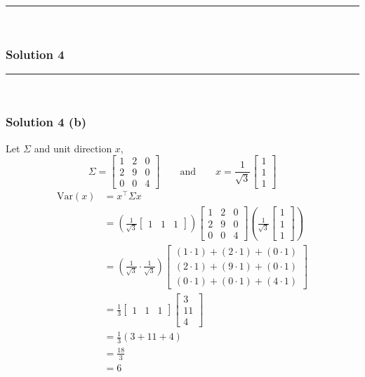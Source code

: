 \documentclass{article}
\begin{document}
\noindent\rule{\textwidth}{0.4pt}\\

\newpage

\subsubsection*{Solution 4}
\noindent\rule{\textwidth}{0.4pt}\\
\subsubsection*{Solution 4 (b)}
Let $\Sigma$ and unit direction $x$,
\[
\Sigma = \begin{bmatrix}
1 & 2 & 0 \\
2 & 9 & 0 \\
0 & 0 & 4
\end{bmatrix}
\qquad\text{and}\qquad
x = \frac{1}{\sqrt{3}}\begin{bmatrix}1 \\ 1 \\ 1\end{bmatrix}
\]
\begin{align*}
\mathrm{Var}(x)
&= x^\top \Sigma x \\
&= \left(\frac{1}{\sqrt{3}}\begin{bmatrix}1 & 1 & 1\end{bmatrix}\right)
\begin{bmatrix}
1 & 2 & 0 \\
2 & 9 & 0 \\
0 & 0 & 4
\end{bmatrix}
\left(\frac{1}{\sqrt{3}}\begin{bmatrix}1 \\ 1 \\ 1\end{bmatrix}\right) \\
&= \left(\frac{1}{\sqrt{3}} \cdot \frac{1}{\sqrt{3}}\right)
\begin{bmatrix}
(1\cdot1) + (2\cdot1) + (0\cdot1) \\
(2\cdot1) + (9\cdot1) + (0\cdot1) \\
(0\cdot1) + (0\cdot1) + (4\cdot1)
\end{bmatrix} \\
&= \frac{1}{3}\begin{bmatrix}1 & 1 & 1\end{bmatrix}
\begin{bmatrix}3 \\ 11 \\ 4\end{bmatrix}\\
&= \frac{1}{3}(3 + 11 + 4) \\
&= \frac{18}{3} \\
&= 6
\end{align*}
\end{document}

